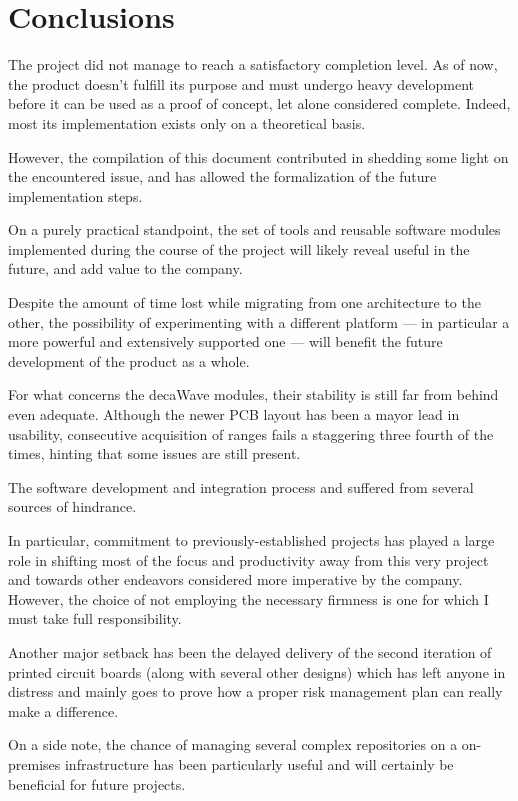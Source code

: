 \chapter{Conclusions}\label{ch:concl}



The project did not manage to reach a satisfactory completion level.
As of now, the product doesn't fulfill its purpose and must undergo heavy development before it can be used as a proof of concept, let alone considered complete.
Indeed, most its implementation exists only on a theoretical basis.

However, the compilation of this document contributed in shedding some light on the encountered issue, and has allowed the formalization of the future implementation steps.

On a purely practical standpoint, the set of tools and reusable software modules implemented during the course of the project will likely reveal useful in the future, and add value to the company.

Despite the amount of time lost while migrating from one architecture to the other, the possibility of experimenting with a different platform --- in particular a more powerful and extensively supported one --- will benefit the future development of the product as a whole.

For what concerns the decaWave modules, their stability is still far from behind even adequate.
Although the newer PCB layout has been a mayor lead in usability, consecutive acquisition of ranges fails a staggering three fourth of the times, hinting that some issues are still present.


The software development and integration process and suffered from several sources of hindrance.

In particular, commitment to previously-established projects has played a large role in shifting most of the focus and productivity away from this very project and towards other endeavors considered more imperative by the company.
However, the choice of not employing the necessary firmness is one for which I must take full responsibility.

Another major setback has been the delayed delivery of the second iteration of printed circuit boards (along with several other designs) which has left anyone in distress and mainly goes to prove how a proper risk management plan can really make a difference.

On a side note, the chance of managing several complex repositories on a on-premises infrastructure has been particularly useful and will certainly be beneficial for future projects.

